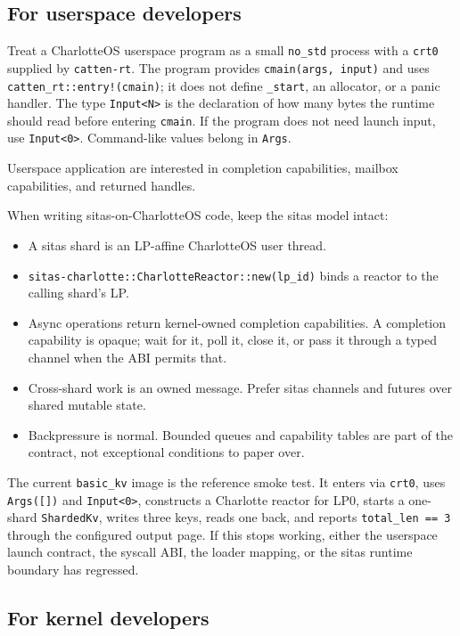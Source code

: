 \subsection{For userspace developers}

Treat a CharlotteOS userspace program as a small \texttt{no\_std} process with
a \texttt{crt0} supplied by \texttt{catten-rt}. The program provides
\texttt{cmain(args, input)} and uses \texttt{catten\_rt::entry!(cmain)}; it
does not define \texttt{\_start}, an allocator, or a panic handler. The type
\texttt{Input<N>} is the declaration of how many bytes the runtime should read
before entering \texttt{cmain}. If the program does not need launch input, use
\texttt{Input<0>}. Command-like values belong in \texttt{Args}.

Userspace application are interested in completion capabilities, mailbox
capabilities, and returned handles.

When writing sitas-on-CharlotteOS code, keep the sitas model intact:
\begin{itemize}
    \item A sitas shard is an LP-affine CharlotteOS user thread.
    \item \texttt{sitas-charlotte::CharlotteReactor::new(lp\_id)} binds a
        reactor to the calling shard's LP.
    \item Async operations return kernel-owned completion capabilities. A
        completion capability is opaque; wait for it, poll it, close it, or
        pass it through a typed channel when the ABI permits that.
    \item Cross-shard work is an owned message. Prefer sitas channels and
        futures over shared mutable state.
    \item Backpressure is normal. Bounded queues and capability tables are part
        of the contract, not exceptional conditions to paper over.
\end{itemize}

The current \texttt{basic\_kv} image is the reference smoke test. It enters via
\texttt{crt0}, uses \texttt{Args([])} and \texttt{Input<0>}, constructs a
Charlotte reactor for LP0, starts a one-shard \texttt{ShardedKv}, writes three
keys, reads one back, and reports \texttt{total\_len == 3} through the
configured output page. If this stops working, either the userspace launch
contract, the syscall ABI, the loader mapping, or the sitas runtime boundary has
regressed.

\subsection{For kernel developers}

